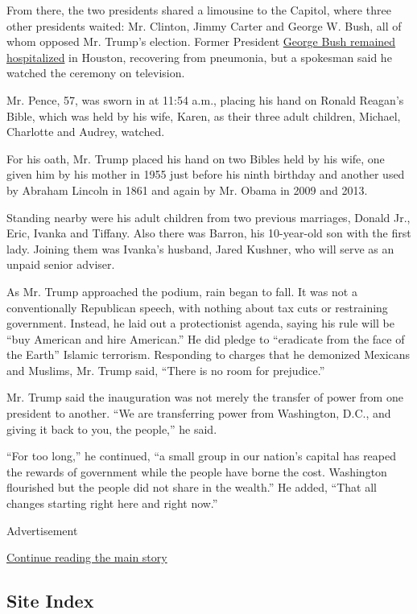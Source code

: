 From there, the two presidents shared a limousine to the Capitol, where
three other presidents waited: Mr. Clinton, Jimmy Carter and George W.
Bush, all of whom opposed Mr. Trump's election. Former President
\href{https://www.nytimes.com/2017/01/18/us/politics/george-barbara-bush-hospitalized.html}{George
Bush remained hospitalized} in Houston, recovering from pneumonia, but a
spokesman said he watched the ceremony on television.

Mr. Pence, 57, was sworn in at 11:54 a.m., placing his hand on Ronald
Reagan's Bible, which was held by his wife, Karen, as their three adult
children, Michael, Charlotte and Audrey, watched.

For his oath, Mr. Trump placed his hand on two Bibles held by his wife,
one given him by his mother in 1955 just before his ninth birthday and
another used by Abraham Lincoln in 1861 and again by Mr. Obama in 2009
and 2013.

Standing nearby were his adult children from two previous marriages,
Donald Jr., Eric, Ivanka and Tiffany. Also there was Barron, his
10-year-old son with the first lady. Joining them was Ivanka's husband,
Jared Kushner, who will serve as an unpaid senior adviser.

As Mr. Trump approached the podium, rain began to fall. It was not a
conventionally Republican speech, with nothing about tax cuts or
restraining government. Instead, he laid out a protectionist agenda,
saying his rule will be ``buy American and hire American.'' He did
pledge to ``eradicate from the face of the Earth'' Islamic terrorism.
Responding to charges that he demonized Mexicans and Muslims, Mr. Trump
said, ``There is no room for prejudice.''

Mr. Trump said the inauguration was not merely the transfer of power
from one president to another. ``We are transferring power from
Washington, D.C., and giving it back to you, the people,'' he said.

``For too long,'' he continued, ``a small group in our nation's capital
has reaped the rewards of government while the people have borne the
cost. Washington flourished but the people did not share in the
wealth.'' He added, ``That all changes starting right here and right
now.''

Advertisement

\protect\hyperlink{after-bottom}{Continue reading the main story}

\hypertarget{site-index}{%
\subsection{Site Index}\label{site-index}}

